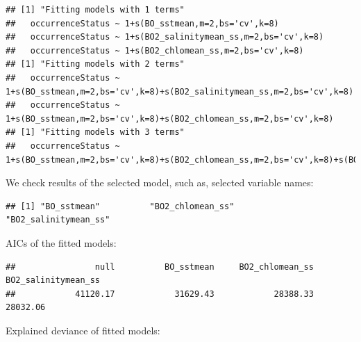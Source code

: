 \documentclass[
]{book}
\newenvironment{Shaded}{\begin{snugshade}}{\end{snugshade}}
\newcommand{\ControlFlowTok}[1]{\textcolor[rgb]{0.13,0.29,0.53}{\textbf{#1}}}
\newcommand{\FunctionTok}[1]{\textcolor[rgb]{0.00,0.00,0.00}{#1}}
\newcommand{\NormalTok}[1]{#1}
\newcommand{\SpecialCharTok}[1]{\textcolor[rgb]{0.00,0.00,0.00}{#1}}
\begin{document}
\begin{verbatim}
## [1] "Fitting models with 1 terms"
##   occurrenceStatus ~ 1+s(BO_sstmean,m=2,bs='cv',k=8) 
##   occurrenceStatus ~ 1+s(BO2_salinitymean_ss,m=2,bs='cv',k=8) 
##   occurrenceStatus ~ 1+s(BO2_chlomean_ss,m=2,bs='cv',k=8) 
## [1] "Fitting models with 2 terms"
##   occurrenceStatus ~ 1+s(BO_sstmean,m=2,bs='cv',k=8)+s(BO2_salinitymean_ss,m=2,bs='cv',k=8) 
##   occurrenceStatus ~ 1+s(BO_sstmean,m=2,bs='cv',k=8)+s(BO2_chlomean_ss,m=2,bs='cv',k=8) 
## [1] "Fitting models with 3 terms"
##   occurrenceStatus ~ 1+s(BO_sstmean,m=2,bs='cv',k=8)+s(BO2_chlomean_ss,m=2,bs='cv',k=8)+s(BO2_salinitymean_ss,m=2,bs='cv',k=8)
\end{verbatim}

We check results of the selected model, such as, selected variable names:

\begin{Shaded}
\end{Shaded}

\begin{verbatim}
## [1] "BO_sstmean"          "BO2_chlomean_ss"     "BO2_salinitymean_ss"
\end{verbatim}

AICs of the fitted models:

\begin{Shaded}
\end{Shaded}

\begin{verbatim}
##                null          BO_sstmean     BO2_chlomean_ss BO2_salinitymean_ss 
##            41120.17            31629.43            28388.33            28032.06
\end{verbatim}

Explained deviance of fitted models:

\begin{Shaded}
\end{Shaded}
\end{document}

